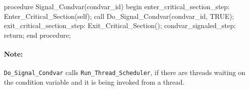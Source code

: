 \documentclass[sigplan,anonymous,10pt]{acmart}
\begin{document}
\begin{ppcal}
procedure Signal_Condvar(condvar_id)
begin
   enter_critical_section_step:
   Enter_Critical_Section(self);
   call Do_Signal_Condvar(condvar_id, TRUE);
   exit_critical_section_step:
   Exit_Critical_Section();
   condvar_signaled_step:
   return;
end procedure;
\end{ppcal}
\begin{tlatex}
%
\@x{ {\p@begin}}%
%
%
%
%
%
%
\@x{ {\p@end} {\p@procedure} {\p@semicolon}}%
\end{tlatex}

\paragraph{Note:} \verb'Do_Signal_Condvar' calls \verb'Run_Thread_Scheduler',
if there are threads waiting on the condition variable and it is being
invoked from a thread.
\end{document}
